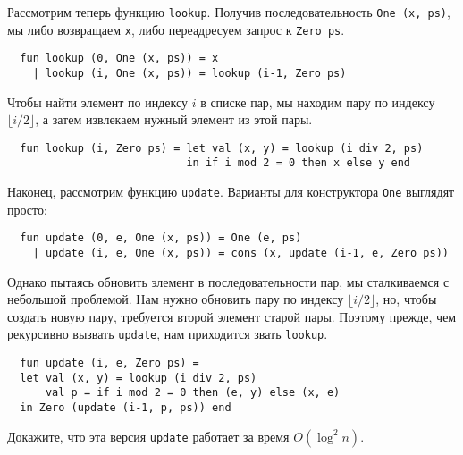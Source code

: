 Рассмотрим теперь функцию \lstinline!lookup!. Получив
последовательность \lstinline!One (x, ps)!, мы либо возвращаем
\lstinline!x!, либо переадресуем запрос к \lstinline!Zero ps!.
\begin{lstlisting}
  fun lookup (0, One (x, ps)) = x
    | lookup (i, One (x, ps)) = lookup (i-1, Zero ps)
\end{lstlisting}
Чтобы найти элемент по индексу $i$ в списке пар, мы находим пару по
индексу $\lfloor i/2 \rfloor$, а затем извлекаем нужный элемент из
этой пары.
\begin{lstlisting}
  fun lookup (i, Zero ps) = let val (x, y) = lookup (i div 2, ps)
                            in if i mod 2 = 0 then x else y end
\end{lstlisting}

Наконец, рассмотрим функцию \lstinline!update!. Варианты для
конструктора \lstinline!One! выглядят просто:
\begin{lstlisting}
  fun update (0, e, One (x, ps)) = One (e, ps)
    | update (i, e, One (x, ps)) = cons (x, update (i-1, e, Zero ps))
\end{lstlisting}
Однако пытаясь обновить элемент в последовательности пар, мы
сталкиваемся с небольшой проблемой. Нам нужно обновить пару по индексу
$\lfloor i/2 \rfloor$, но, чтобы создать новую пару, требуется второй
элемент старой пары. Поэтому прежде, чем рекурсивно вызвать
\lstinline!update!, нам приходится звать \lstinline!lookup!.
\begin{lstlisting}
  fun update (i, e, Zero ps) = 
  let val (x, y) = lookup (i div 2, ps)
      val p = if i mod 2 = 0 then (e, y) else (x, e)
  in Zero (update (i-1, p, ps)) end
\end{lstlisting}

\begin{exercise}\label{ex:10.1}
  Докажите, что эта версия \lstinline!update! работает за время
  $O(\log^2 n)$.
\end{exercise}

